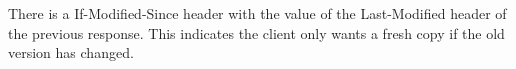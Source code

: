 There is a If-Modified-Since header with the value of the Last-Modified header of the previous response. This indicates the client only wants a fresh copy if the old version has changed.
